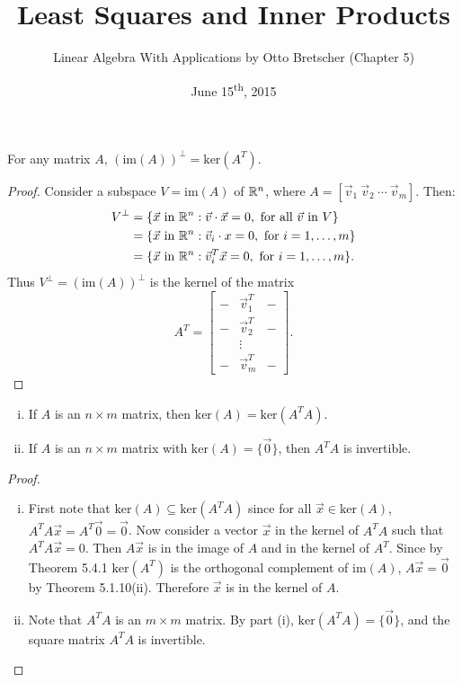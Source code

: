\documentclass[a4paper,11pt]{article}
\title{Least Squares and Inner Products}
\author{Linear Algebra With Applications by Otto Bretscher (Chapter 5)}
\date{June 15\textsuperscript{th}, 2015}
\begin{document}
\maketitle
{}

\begin{outline}

    For any matrix \(A\), \((\text{im}(A))^{\perp} = \text{ker}(A^T)\).

    \begin{proof}
      Consider a subspace \(V = \text{im}(A)\) of \(\mathbb{R}^n\), where \(A = \left[\vec{v}_1\:\vec{v}_2\:\cdots\:\vec{v}_m\right]\). Then:
      \begin{align*}
        V^{\perp} &= \{ \vec{x}\text{ in }\mathbb{R}^n: \vec{v}\cdot\vec{x} = 0,\text{ for all } \vec{v} \text{ in } V \} \\
                  &= \{ \vec{x}\text{ in }\mathbb{R}^n: \vec{v}_i\cdot x = 0,\text{ for } i = 1,\ldots,m \} \\
                  &= \{ \vec{x}\text{ in }\mathbb{R}^n: \vec{v}_i^T\vec{x} = 0, \text{ for } i = 1, \ldots, m \}\text{.}
      \end{align*}
      Thus \(V^{\perp} = (\text{im}(A))^{\perp}\) is the kernel of the matrix
      \[ A^T = \begin{bmatrix}- & \vec{v}_1^T & - \\ - & \vec{v}_2^T & - \\ & \vdots & \\ - & \vec{v}_m^T & - \end{bmatrix}\text{.} \]
    \end{proof}

    \begin{enumerate}[i.]
      \item If \(A\) is an \(n \times m\) matrix, then \(\text{ker}(A) = \text{ker}(A^TA)\).
      \item If \(A\) is an \(n \times m\) matrix with \(\text{ker}(A) = \{\vec{0}\}\), then \(A^TA\) is invertible.
    \end{enumerate}

    \begin{proof}
      \begin{enumerate}[i.]
        \item
          First note that \(\text{ker}(A) \subseteq \text{ker}(A^TA)\) since for all \(\vec{x}\in\text{ker}(A)\), \(A^TA\vec{x} = A^T\vec{0} = \vec{0}\).
          Now consider a vector \(\vec{x}\) in the kernel of \(A^TA\) such that \(A^TA\vec{x}=0\). Then \(A\vec{x}\) is in the image of \(A\) and in
          the kernel of \(A^T\). Since by Theorem 5.4.1 \(\text{ker}(A^T)\) is the orthogonal complement of \(\text{im}(A)\), \(A\vec{x} = \vec{0}\) by
          Theorem 5.1.10(ii). Therefore \(\vec{x}\) is in the kernel of \(A\).
        \item
          Note that \(A^TA\) is an \(m \times m\) matrix. By part (i), \(\text{ker}(A^TA) = \{\vec{0}\}\), and the square matrix \(A^TA\) is invertible.
      \end{enumerate}
    \end{proof}


\end{outline}
\end{document}
